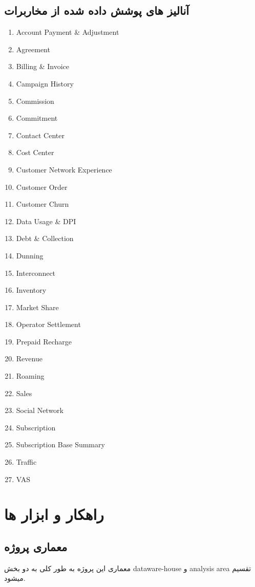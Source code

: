 \documentclass{llncs}
\begin{document}
\subsection{آنالیز های پوشش داده شده از مخاربرات}
\begin{enumerate}
    \item Account Payment \& Adjustment
    \item Agreement
    \item Billing \& Invoice
    \item Campaign History
    \item Commission
    \item Commitment
    \item Contact Center
    \item Cost Center
    \item Customer Network Experience
    \item Customer Order
    \item Customer Churn
    \item Data Usage & DPI
    \item Debt & Collection
    \item Dunning
    \item Interconnect
    \item Inventory
    \item Market Share
    \item Operator Settlement
    \item Prepaid Recharge
    \item Revenue
    \item Roaming
    \item Sales
    \item Social Network
    \item Subscription
    \item Subscription Base Summary
    \item Traffic
    \item VAS
\end{enumerate}


\section {راهکار و ابزار ها}
\subsection{معماری پروژه }
معماری این پروژه به طور کلی به دو بخش dataware-house و analysis area تقسیم میشود.
\end{document}
